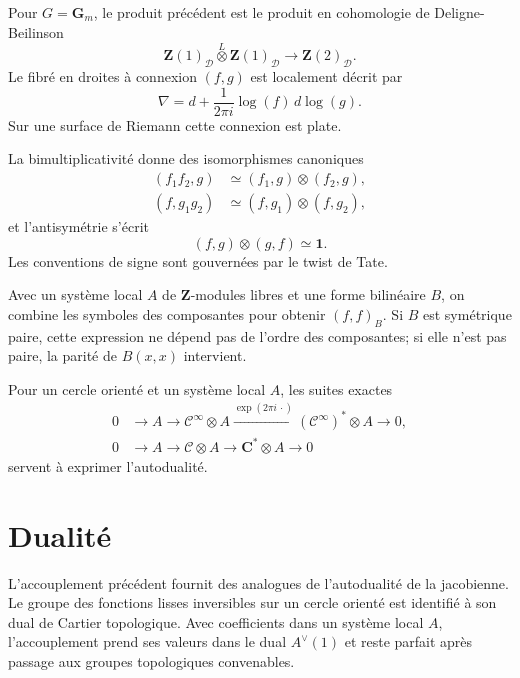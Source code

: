 \documentclass[11pt]{article}
\newcommand{\C}{\mathbf C}
\newcommand{\Z}{\mathbf Z}
\newcommand{\Gm}{\mathbf G_m}
\newcommand{\CC}{\mathcal C}
\begin{document}
Pour $G=\Gm$, le produit précédent est le produit en cohomologie de Deligne-Beilinson
\begin{equation}\tag{3.1.1}
 \Z(1)_{\mathcal D}\overset L\otimes \Z(1)_{\mathcal D}\longrightarrow \Z(2)_{\mathcal D}.
\end{equation}
Le fibré en droites à connexion $(f,g)$ est localement décrit par
\begin{equation}\tag{3.1.2}
 \nabla=d+\frac{1}{2\pi i}\log(f)\,d\log(g).
\end{equation}
Sur une surface de Riemann cette connexion est plate.

La bimultiplicativité donne des isomorphismes canoniques
\begin{align}\tag{3.7.1}
 (f_1f_2,g)&\simeq(f_1,g)\otimes(f_2,g),\\
 (f,g_1g_2)&\simeq(f,g_1)\otimes(f,g_2),
\end{align}
et l'antisymétrie s'écrit
\begin{equation}\tag{3.8.1}
 (f,g)\otimes(g,f)\simeq\mathbf 1.
\end{equation}
Les conventions de signe sont gouvernées par le twist de Tate.

Avec un système local $A$ de $\Z$-modules libres et une forme bilinéaire $B$, on combine les symboles des composantes pour obtenir $(f,f)_B$. Si $B$ est symétrique paire, cette expression ne dépend pas de l'ordre des composantes; si elle n'est pas paire, la parité de $B(x,x)$ intervient.

Pour un cercle orienté et un système local $A$, les suites exactes
\begin{align}\tag{3.13.1}
 0&\longrightarrow A\longrightarrow \CC^\infty\otimes A\xrightarrow{\exp(2\pi i\,\cdot)}(\CC^\infty)^*\otimes A\longrightarrow0,\\
 0&\longrightarrow A\longrightarrow \CC\otimes A\longrightarrow \C^*\otimes A\longrightarrow0
\end{align}
servent à exprimer l'autodualité.

\section{Dualité}

L'accouplement précédent fournit des analogues de l'autodualité de la jacobienne. Le groupe des fonctions lisses inversibles sur un cercle orienté est identifié à son dual de Cartier topologique. Avec coefficients dans un système local $A$, l'accouplement prend ses valeurs dans le dual $A^\vee(1)$ et reste parfait après passage aux groupes topologiques convenables.
\end{document}

